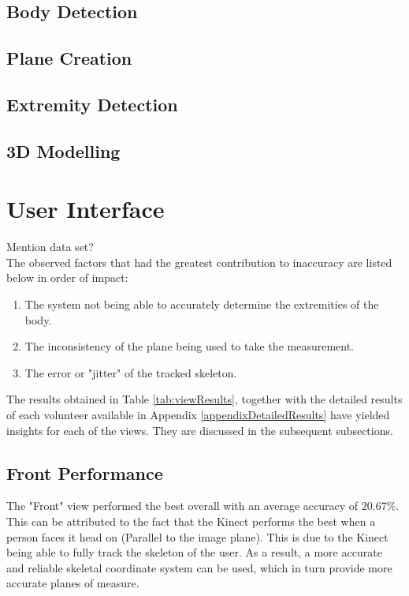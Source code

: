\subsection{Body Detection}

\subsection{Plane Creation}

\subsection{Extremity Detection}

\subsection{3D Modelling}

\section{User Interface}

\iffalse

Mention data set?\\

The observed factors that had the greatest contribution to inaccuracy are listed below in order of impact:

\begin{enumerate}
	\item The system not being able to accurately determine the extremities of the body.
	\item The inconsistency of the plane being used to take the measurement.
	\item The error or "jitter" of the tracked skeleton.
\end{enumerate}



The results obtained in Table \ref{tab:viewResults}, together with the detailed results of each volunteer available in Appendix \ref{appendixDetailedResults} have yielded insights for each of the views. They are discussed in the subsequent subsections. 

\subsection{Front Performance}

The "Front" view performed the best overall with an average accuracy of 20.67\%. This can be attributed to the fact that the Kinect performs the best when a person faces it head on (Parallel to the image plane). This is due to the Kinect being able to fully track the skeleton of the user. As a result, a more accurate and reliable skeletal coordinate system can be used, which in turn provide more accurate planes of measure. 

